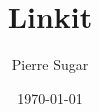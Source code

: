 \documentclass[10pt, a4paper]{article}
\begin{document}
\title{Linkit}
\author{Pierre Sugar\\
}
\date{\today}
\maketitle

\begin{abstract}
\end{abstract}
\end{document}
